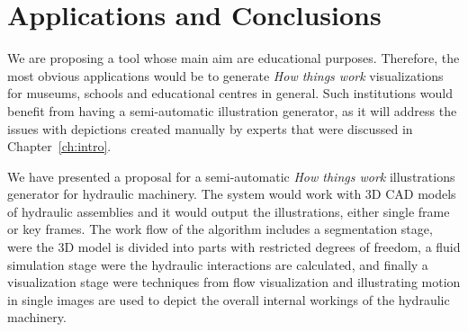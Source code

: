 \chapter{Applications and Conclusions}

We are proposing a tool whose main aim are educational purposes.
Therefore, the most obvious applications would be to generate \textit{How things work} visualizations for museums, schools and educational centres in general.
Such institutions would benefit from having a semi-automatic illustration generator, as it will address the issues with depictions created manually by experts that were discussed in Chapter~\ref{ch:intro}.

We have presented a proposal for a semi-automatic \textit{How things work} illustrations generator for hydraulic machinery.
The system would work with 3D CAD models of hydraulic assemblies and it would output the illustrations, either single frame or key frames.
The work flow of the algorithm includes a segmentation stage, were the 3D model is divided into parts with restricted degrees of freedom, a fluid simulation stage were the hydraulic interactions are calculated, and finally a visualization stage were techniques from flow visualization and illustrating motion in single images are used to depict the overall internal workings of the hydraulic machinery.